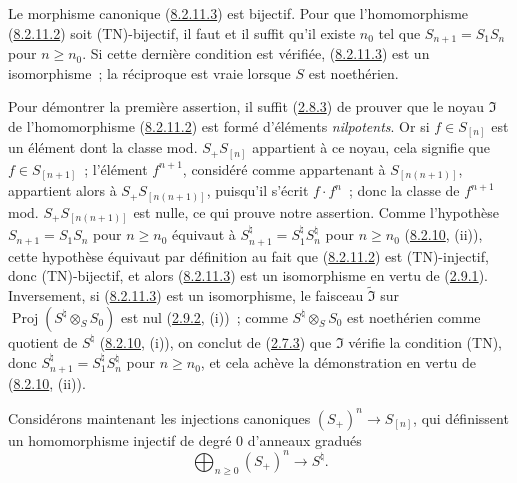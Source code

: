 
\begin{proposition}[8.2.12]
\label{II.8.2.12-fr}
Le morphisme canonique (\hyperref[II.8.2.11.3-fr]{8.2.11.3}) est bijectif.
Pour que l'homomorphisme (\hyperref[II.8.2.11.2-fr]{8.2.11.2}) soit
(TN)-bijectif, il faut et il suffit qu'il existe $n_0$ tel que
$S_{n+1}=S_1S_n$ pour $n\geq n_0$. Si cette dernière condition est vérifiée,
(\hyperref[II.8.2.11.3-fr]{8.2.11.3}) est un isomorphisme~; la réciproque est
vraie lorsque $S$ est noethérien.
\end{proposition}

Pour démontrer la première assertion, il suffit
(\hyperref[II.2.8.3-fr]{2.8.3}) de prouver que le noyau $\mathfrak{I}$ de
l'homomorphisme (\hyperref[II.8.2.11.2-fr]{8.2.11.2}) est formé d'éléments
\emph{nilpotents}. Or si $f\in S_{[n]}$ est un élément dont la classe mod.
$S_+S_{[n]}$ appartient à ce noyau, cela signifie que $f\in S_{[n+1]}$~;
l'élément $f^{n+1}$, considéré comme appartenant à $S_{[n(n+1)]}$, appartient
alors à $S_+S_{[n(n+1)]}$, puisqu'il s'écrit $f\cdot f^n$~; donc la classe de
$f^{n+1}$ mod. $S_+S_{[n(n+1)]}$ est nulle, ce qui prouve notre assertion.
Comme l'hypothèse $S_{n+1}=S_1S_n$ pour $n\geq n_0$ équivaut à
$S_{n+1}^{\natural}=S_1^{\natural}S_n^{\natural}$ pour $n\geq n_0$
(\hyperref[II.8.2.10-fr]{8.2.10}, (ii)), cette hypothèse équivaut par définition
au fait que (\hyperref[II.8.2.11.2-fr]{8.2.11.2}) est (TN)-injectif, donc
(TN)-bijectif, et alors (\hyperref[II.8.2.11.3-fr]{8.2.11.3}) est un
isomorphisme en vertu de (\hyperref[II.2.9.1-fr]{2.9.1}). Inversement, si
(\hyperref[II.8.2.11.3-fr]{8.2.11.3}) est un isomorphisme, le faisceau
$\widetilde{\mathfrak{I}}$ sur
$\operatorname{Proj}(S^{\natural}\otimes_S S_0)$ est nul
(\hyperref[II.2.9.2-fr]{2.9.2}, (i))~; comme
$S^{\natural}\otimes_S S_0$ est noethérien comme quotient de $S^{\natural}$
(\hyperref[II.8.2.10-fr]{8.2.10}, (i)), on conclut de
(\hyperref[II.2.7.3-fr]{2.7.3}) que $\mathfrak{I}$ vérifie la condition (TN),
donc $S_{n+1}^{\natural}=S_1^{\natural}S_n^{\natural}$ pour $n\geq n_0$, et
cela achève la démonstration en vertu de
(\hyperref[II.8.2.10-fr]{8.2.10}, (ii)).

\begin{env}[8.2.13]
\label{II.8.2.13-fr}
Considérons maintenant les injections canoniques $(S_+)^n\to S_{[n]}$, qui
définissent un homomorphisme injectif de degré $0$ d'anneaux gradués
\begin{equation}
\label{II.8.2.13.1-fr}
  \bigoplus_{n\geq0}(S_+)^n\to S^{\natural}.
\tag{8.2.13.1}
\end{equation}
\end{env}

